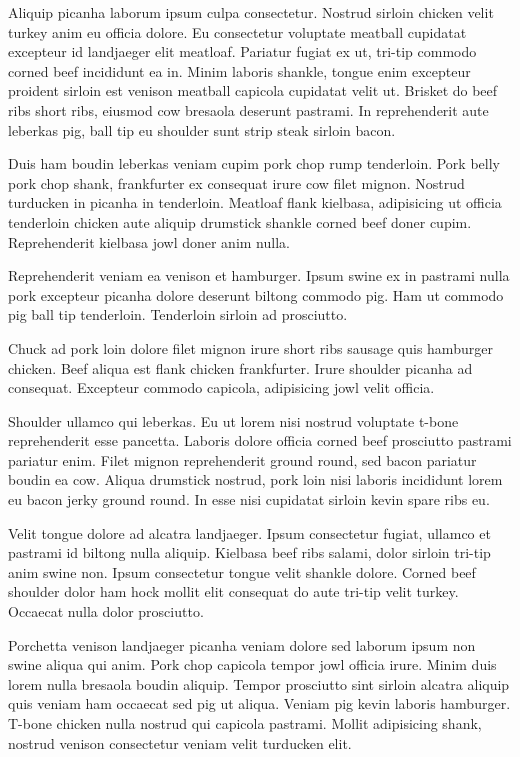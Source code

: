 Aliquip picanha laborum ipsum culpa consectetur. Nostrud sirloin chicken velit turkey anim eu officia dolore. Eu consectetur voluptate meatball cupidatat excepteur id landjaeger elit meatloaf. Pariatur fugiat ex ut, tri-tip commodo corned beef incididunt ea in. Minim laboris shankle, tongue enim excepteur proident sirloin est venison meatball capicola cupidatat velit ut. Brisket do beef ribs short ribs, eiusmod cow bresaola deserunt pastrami. In reprehenderit aute leberkas pig, ball tip eu shoulder sunt strip steak sirloin bacon.

Duis ham boudin leberkas veniam cupim pork chop rump tenderloin. Pork belly pork chop shank, frankfurter ex consequat irure cow filet mignon. Nostrud turducken in picanha in tenderloin. Meatloaf flank kielbasa, adipisicing ut officia tenderloin chicken aute aliquip drumstick shankle corned beef doner cupim. Reprehenderit kielbasa jowl doner anim nulla.

Reprehenderit veniam ea venison et hamburger. Ipsum swine ex in pastrami nulla pork excepteur picanha dolore deserunt biltong commodo pig. Ham ut commodo pig ball tip tenderloin. Tenderloin sirloin ad prosciutto.

Chuck ad pork loin dolore filet mignon irure short ribs sausage quis hamburger chicken. Beef aliqua est flank chicken frankfurter. Irure shoulder picanha ad consequat. Excepteur commodo capicola, adipisicing jowl velit officia.

Shoulder ullamco qui leberkas. Eu ut lorem nisi nostrud voluptate t-bone reprehenderit esse pancetta. Laboris dolore officia corned beef prosciutto pastrami pariatur enim. Filet mignon reprehenderit ground round, sed bacon pariatur boudin ea cow. Aliqua drumstick nostrud, pork loin nisi laboris incididunt lorem eu bacon jerky ground round. In esse nisi cupidatat sirloin kevin spare ribs eu.

Velit tongue dolore ad alcatra landjaeger. Ipsum consectetur fugiat, ullamco et pastrami id biltong nulla aliquip. Kielbasa beef ribs salami, dolor sirloin tri-tip anim swine non. Ipsum consectetur tongue velit shankle dolore. Corned beef shoulder dolor ham hock mollit elit consequat do aute tri-tip velit turkey. Occaecat nulla dolor prosciutto.

Porchetta venison landjaeger picanha veniam dolore sed laborum ipsum non swine aliqua qui anim. Pork chop capicola tempor jowl officia irure. Minim duis lorem nulla bresaola boudin aliquip. Tempor prosciutto sint sirloin alcatra aliquip quis veniam ham occaecat sed pig ut aliqua. Veniam pig kevin laboris hamburger. T-bone chicken nulla nostrud qui capicola pastrami. Mollit adipisicing shank, nostrud venison consectetur veniam velit turducken elit.

